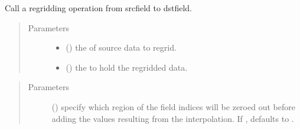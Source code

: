 \documentclass[letterpaper,10pt,english]{sphinxmanual}
\begin{document}
\begin{fulllineitems}
\begin{quote}
\begin{description}
\begin{itemize}
\end{itemize}

\end{description}\end{quote}

\begin{fulllineitems}
\label{\detokenize{regrid:ESMF.api.regrid.Regrid.__call__}}
Call a regridding operation from srcfield to dstfield.

\begin{quote}\begin{description}
\item[{Parameters}] \leavevmode\begin{itemize}
\item {} 
 ({\hyperref[\detokenize{field:ESMF.api.field.Field}]{}}) \textendash{} the {\hyperref[\detokenize{field:ESMF.api.field.Field}]{}} of source data to regrid.

\item {} 
 ({\hyperref[\detokenize{field:ESMF.api.field.Field}]{}}) \textendash{} the {\hyperref[\detokenize{field:ESMF.api.field.Field}]{}} to hold the regridded data.

\end{itemize}

\end{description}\end{quote}

\begin{quote}\begin{description}
\item[{Parameters}] \leavevmode
{} ({\hyperref[\detokenize{Region:ESMF.api.constants.Region}]{}}) \textendash{} specify which region of the field indices
will be zeroed out before adding the values resulting from the
interpolation.  If , defaults to
{\hyperref[\detokenize{Region:ESMF.api.constants.Region.TOTAL}]{}}.


\end{description}
\end{quote}
\end{fulllineitems}
\end{fulllineitems}
\end{document}
